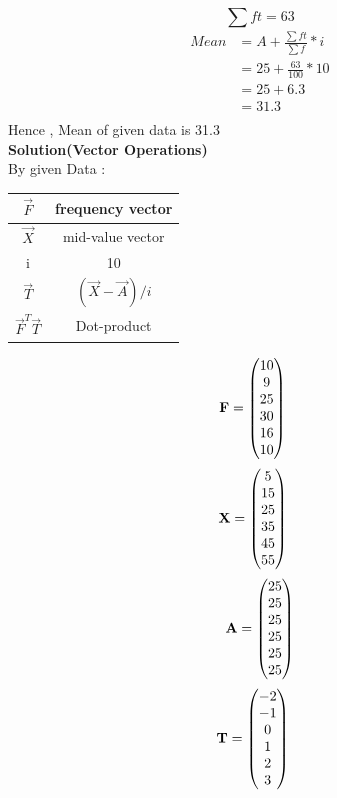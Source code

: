 \documentclass[journal,12pt,twocolumn]{IEEEtran}
\begin{document}
\begin{equation*}
\sum ft = 63
\end{equation*}
\begin{align*}
Mean & = A + \frac{ \sum ft }{\sum f} * i\\
     & = 25 + \frac{63}{100} * 10\\
     & = 25 + 6.3\\
     & = 31.3\\\
\end{align*}
Hence , Mean of given data is 31.3\\
\textbf{Solution(Vector Operations)}\\
By given Data :\\
\begin{table}[h!]
\center
{
\begin{tabular}{|c|c|}
\hline
$\vec{F}$ & frequency vector\\
\hline
$\vec{X}$ & mid-value vector\\
\hline
i &  10\\
\hline
$\vec{T}$ &  $(\vec{X}-\vec{A})/i$\\
\hline
$\vec{F}^{T}\vec{T}$ &  Dot-product\\
\hline
\end{tabular}
}
\end{table}
\begin{align}
\mathbf{F} & = 
\begin{pmatrix}10 \\ 9 \\ 25 \\ 30 \\ 16 \\ 10\end{pmatrix}
\end{align}
\begin{align}
\mathbf{X} & = 
\begin{pmatrix}5 \\ 15 \\ 25 \\ 35 \\ 45 \\ 55\end{pmatrix}
\end{align}
\begin{align}
\mathbf{A} = 
\begin{pmatrix}25\\25\\25\\25\\25\\25\end{pmatrix}
\end{align}
\begin{align}
\mathbf{T} & =
\begin{pmatrix}-2 \\ -1 \\ 0 \\ 1 \\ 2 \\ 3 \end{pmatrix}
\end{align}
\end{document}
